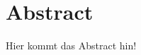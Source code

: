 

%
%




\newpage
{}
\tableofcontents
\listoftables
\listoffigures


\newpage

\section{Abstract}
Hier kommt das Abstract hin!


